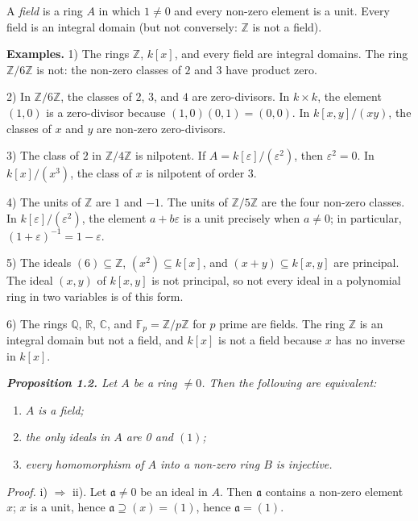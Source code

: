 A \emph{field} is a ring $A$ in which $1\ne0$ and every non-zero element is a unit.
Every field is an integral domain (but not conversely: $\mathbb Z$ is not a field).

\textline
\noindent\textbf{Examples.} 1) The rings $\mathbb Z$, $k[x]$, and every field
are integral domains.  The ring $\mathbb Z/6\mathbb Z$ is not: the non-zero
classes of $2$ and $3$ have product zero.

2) In $\mathbb Z/6\mathbb Z$, the classes of $2$, $3$, and $4$ are
zero-divisors.  In $k\times k$, the element $(1,0)$ is a zero-divisor because
$(1,0)(0,1)=(0,0)$.  In $k[x,y]/(xy)$, the classes of $x$ and $y$ are non-zero
zero-divisors.

3) The class of $2$ in $\mathbb Z/4\mathbb Z$ is nilpotent.  If
$A=k[\varepsilon]/(\varepsilon^2)$, then $\varepsilon^2=0$.  In
$k[x]/(x^3)$, the class of $x$ is nilpotent of order $3$.

4) The units of $\mathbb Z$ are $1$ and $-1$.  The units of
$\mathbb Z/5\mathbb Z$ are the four non-zero classes.  In
$k[\varepsilon]/(\varepsilon^2)$, the element $a+b\varepsilon$ is a unit
precisely when $a\neq0$; in particular,
$(1+\varepsilon)^{-1}=1-\varepsilon$.

5) The ideals $(6)\subseteq\mathbb Z$, $(x^2)\subseteq k[x]$, and
$(x+y)\subseteq k[x,y]$ are principal.  The ideal $(x,y)$ of $k[x,y]$ is not
principal, so not every ideal in a polynomial ring in two variables is of this
form.

6) The rings $\mathbb Q$, $\mathbb R$, $\mathbb C$, and
$\mathbb F_p=\mathbb Z/p\mathbb Z$ for $p$ prime are fields.  The ring
$\mathbb Z$ is an integral domain but not a field, and $k[x]$ is not a field
because $x$ has no inverse in $k[x]$.
\textline

\medskip
\noindent\textit{\textbf{Proposition 1.2.} Let $A$ be a ring $\ne0$.  Then the following are equivalent:}
\begin{enumerate}
\renewcommand{\labelenumi}{\roman{enumi})}
\item \textit{$A$ is a field;}
\item \textit{the only ideals in $A$ are 0 and $(1)$;}
\item \textit{every homomorphism of $A$ into a non-zero ring $B$ is injective.}
\end{enumerate}
\noindent\emph{Proof.} i) $\Rightarrow$ ii).  Let $\mathfrak a\ne0$ be an ideal in $A$.  Then $\mathfrak a$ contains a non-zero
element $x$; $x$ is a unit, hence $\mathfrak a\supseteq(x)=(1)$, hence $\mathfrak a=(1)$.

